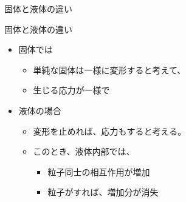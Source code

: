 \documentclass[uplatex,dvipdfmx,a4paper,11pt]{jsarticle}
\begin{document}
\begin{qlist}
\begin{qlist2}
			\qitem 固体と液体の違い
				\begin{itembox}[l]{固体と液体の違い}
					\begin{itemize}
						\item 固体では
						\begin{itemize}
							\item 単純な固体は一様に変形すると考えて、
							\item 生じる応力が一様で\qbox{}
						\end{itemize}
						\item 液体の場合
						\begin{itemize}
							\item 変形を止めれば、応力も\qbox{}すると考える。
							\item このとき、液体内部では、
							\begin{itemize}
								\item 粒子同士の相互作用が増加
								\item 粒子が\qbox{}すれば、増加分が消失
							\end{itemize}
						\end{itemize}
					\end{itemize}
				\end{itembox}
				

\end{qlist2}
\end{qlist}
\end{document}
